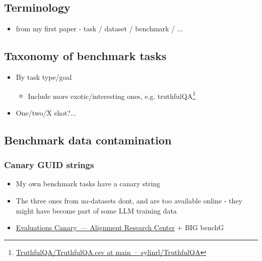 \subsection{Terminology}\label{terminology}

\begin{itemize}
\tightlist
\item
  from my first paper - task / dataset / benchmark / ...
\end{itemize}

\subsection{Taxonomy of benchmark
tasks}\label{taxonomy-of-benchmark-tasks}

\begin{itemize}
\tightlist
\item
  By task type/goal

  \begin{itemize}
  \tightlist
  \item
    Include more exotic/interesting ones, e.g. truthfulQA\footnote{\href{https://github.com/sylinrl/TruthfulQA/blob/main/TruthfulQA.csv}{TruthfulQA/TruthfulQA.csv
      at main · sylinrl/TruthfulQA}}
  \end{itemize}
\item
  One/two/X shot?...
\end{itemize}

\subsection{Benchmark data
contamination}\label{benchmark-data-contamination}

\subsubsection{Canary GUID strings}\label{canary-guid-strings}

\begin{itemize}
\tightlist
\item
  My own benchmark tasks have a canary string
\item
  The three ones from ua-datasets don\textquotesingle t, and are too
  available online - they might have become part of some LLM training
  data
\item
  \href{https://www.alignment.org/canary/}{Evaluations Canary~---
  Alignment Research Center} + BIG benchG
\end{itemize}

